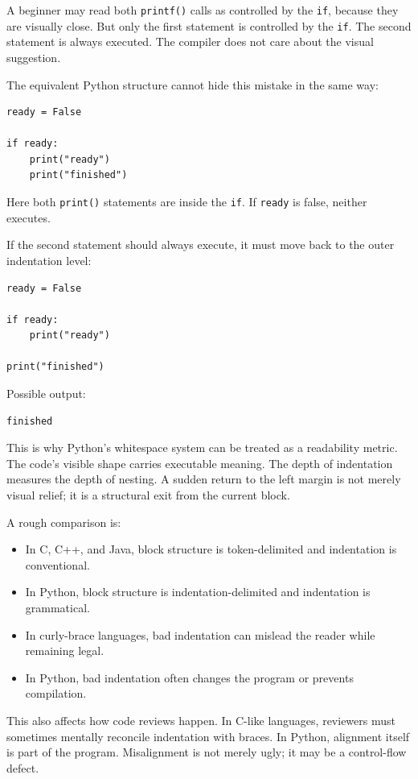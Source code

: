 \documentclass[a4paper,twoside]{report}
\begin{document}
A beginner may read both \texttt{printf()} calls as controlled by the \texttt{if}, because they are visually close. But only the first statement is controlled by the \texttt{if}. The second statement is always executed. The compiler does not care about the visual suggestion.

The equivalent Python structure cannot hide this mistake in the same way:

\begin{verbatim}
ready = False

if ready:
    print("ready")
    print("finished")
\end{verbatim}

Here both \texttt{print()} statements are inside the \texttt{if}. If \texttt{ready} is false, neither executes.

If the second statement should always execute, it must move back to the outer indentation level:

\begin{verbatim}
ready = False

if ready:
    print("ready")

print("finished")
\end{verbatim}

Possible output:

\begin{verbatim}
finished
\end{verbatim}

This is why Python's whitespace system can be treated as a readability metric. The code's visible shape carries executable meaning. The depth of indentation measures the depth of nesting. A sudden return to the left margin is not merely visual relief; it is a structural exit from the current block.

A rough comparison is:

\begin{itemize}
    \item In C, C++, and Java, block structure is token-delimited and indentation is conventional.
    \item In Python, block structure is indentation-delimited and indentation is grammatical.
    \item In curly-brace languages, bad indentation can mislead the reader while remaining legal.
    \item In Python, bad indentation often changes the program or prevents compilation.
\end{itemize}

This also affects how code reviews happen. In C-like languages, reviewers must sometimes mentally reconcile indentation with braces. In Python, alignment itself is part of the program. Misalignment is not merely ugly; it may be a control-flow defect.
\end{document}
